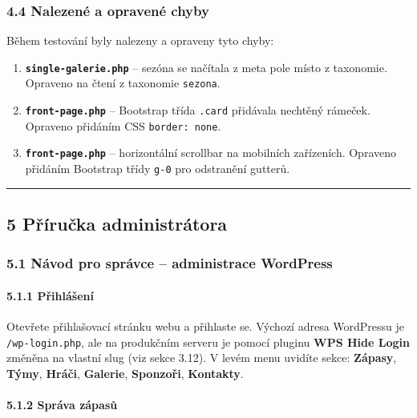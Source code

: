 \subsubsection{4.4 Nalezené a opravené
chyby}\label{nalezenuxe9-a-opravenuxe9-chyby}

Během testování byly nalezeny a opraveny tyto chyby:

\begin{enumerate}
\def\labelenumi{\arabic{enumi}.}
\tightlist
\item
  \textbf{\texttt{single-galerie.php}} -- sezóna se načítala z meta pole
  místo z taxonomie. Opraveno na čtení z taxonomie \texttt{sezona}.
\item
  \textbf{\texttt{front-page.php}} -- Bootstrap třída \texttt{.card}
  přidávala nechtěný rámeček. Opraveno přidáním CSS
  \texttt{border:\ none}.
\item
  \textbf{\texttt{front-page.php}} -- horizontální scrollbar na
  mobilních zařízeních. Opraveno přidáním Bootstrap třídy \texttt{g-0}
  pro odstranění gutterů.
\end{enumerate}

\begin{center}\rule{0.5\linewidth}{0.5pt}\end{center}

\subsection{5 Příručka
administrátora}\label{pux159uxedruux10dka-administruxe1tora}

\subsubsection{5.1 Návod pro správce -- administrace
WordPress}\label{nuxe1vod-pro-spruxe1vce-administrace-wordpress}

\paragraph{5.1.1 Přihlášení}\label{pux159ihluxe1ux161enuxed}

Otevřete přihlašovací stránku webu a přihlaste se. Výchozí adresa
WordPressu je \texttt{/wp-login.php}, ale na produkčním serveru je
pomocí pluginu \textbf{WPS Hide Login} změněna na vlastní slug (viz
sekce 3.12). V levém menu uvidíte sekce: \textbf{Zápasy}, \textbf{Týmy},
\textbf{Hráči}, \textbf{Galerie}, \textbf{Sponzoři}, \textbf{Kontakty}.

\paragraph{5.1.2 Správa zápasů}\label{spruxe1va-zuxe1pasux16f}

